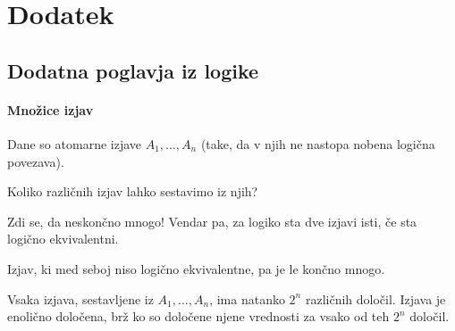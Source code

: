 \documentclass[11pt,paper=b5,DIV=13,headinclude,footinclude]{scrbook}
\def\sledi {{~\Rightarrow~}}
\begin{document}
%
%
%
%
%
%
%
%
%
%
%
%
%
%




\appendix
\cleardoublepage\part*{Dodatek}

\chapter{Dodatna poglavja iz logike}
\subsection{Množice izjav}

Dane so atomarne izjave $A_1,\ldots, A_n$ (take, da v njih ne nastopa nobena logična povezava).

Koliko različnih izjav lahko sestavimo iz njih?

Zdi se, da neskončno mnogo! Vendar pa, za logiko sta dve izjavi isti, če sta logično ekvivalentni.

Izjav, ki med seboj niso logično ekvivalentne, pa je le končno mnogo.

Vsaka izjava, sestavljene iz $A_1,\ldots, A_n$, ima natanko $2^n$ različnih določil.
Izjava je enolično določena, brž ko so določene njene vrednosti za vsako od teh $2^n$ določil.
\end{document}
